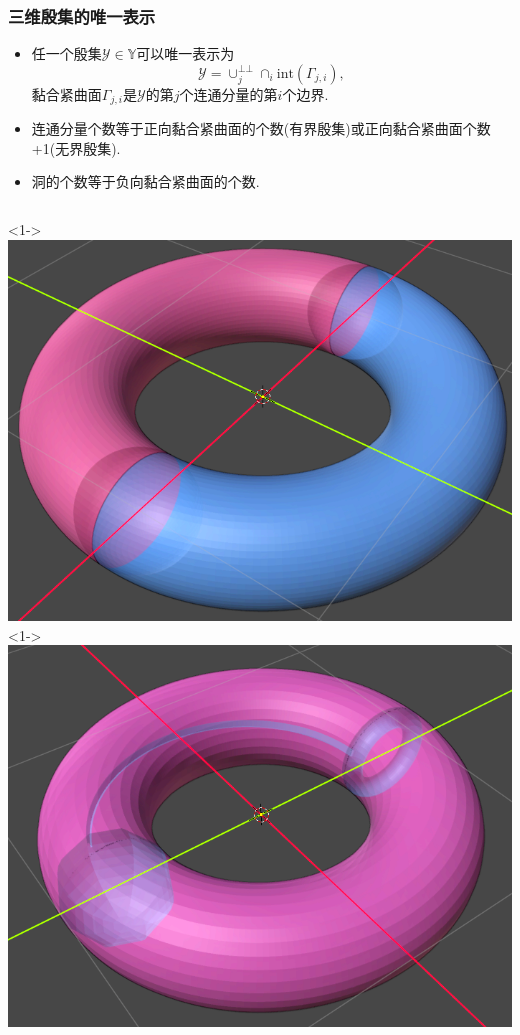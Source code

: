 \documentclass[UTF8]{ctexbeamer}	%
\theoremstyle{plain}
\theoremstyle{definition}
\theoremstyle{remark}
\numberwithin{equation}{section}
\begin{document}
\begin{frame}
    \frametitle{三维殷集的唯一表示}
    \begin{itemize}
        \item 任一个殷集$\mathcal{Y} \in \mathbb{Y}$可以唯一表示为
              \[\mathcal{Y} = \cup_j^{\bot \bot} \cap_i \text{int}(\Gamma_{j, i}),\]
              黏合紧曲面$\Gamma_{j, i}$是$\mathcal{Y}$的第$j$个连通分量的第$i$个边界.
        \item 连通分量个数等于正向黏合紧曲面的个数(有界殷集)或正向黏合紧曲面个数+1(无界殷集).

        \item 洞的个数等于负向黏合紧曲面的个数.
    \end{itemize}
    \begin{columns}
        <1->
        \includegraphics[width = \textwidth]{fig/ys1.png}
        <1->
        \includegraphics[width = \textwidth]{fig/ys5.png}
    \end{columns}
\end{frame}
\end{document}
